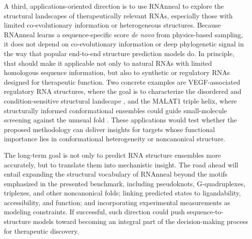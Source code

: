 A third, applications-oriented direction is to use RNAnneal to explore the structural landscapes of therapeutically relevant RNAs, especially those with limited co-evolutionary information or heterogeneous structures. Because RNAnneal learns a sequence-specific score \textit{de novo} from physics-based sampling, it does not depend on co-evolutionary information or deep phylogenetic signal in the way that popular end-to-end structure prediction models do. In principle, that should make it applicable not only to natural RNAs with limited homologous sequence information, but also to synthetic or regulatory RNAs designed for therapeutic function. Two concrete examples are VEGF-associated regulatory RNA structures, where the goal is to characterize the disordered and condition-sensitive structural landscape \citep{ray2009vegfa}, and the MALAT1 triple helix, where structurally informed conformational ensembles could guide small-molecule screening against the unusual fold \citep{brown2014malat1,donlic2018malat1}. These applications would test whether the proposed methodology can deliver insights for targets whose functional importance lies in conformational heterogeneity or noncanonical structure.

The long-term goal is not only to predict RNA structure ensembles more accurately, but to translate them into mechanistic insight. The road ahead will entail expanding the structural vocabulary of RNAnneal beyond the motifs emphasized in the presented benchmark, including pseudoknots, G-quadruplexes, triplexes, and other noncanonical folds; linking predicted states to ligandability, accessibility, and function; and incorporating experimental measurements as modeling constraints. If successful, such direction could push sequence-to-structure models toward becoming an integral part of the decision-making process for therapeutic discovery.
